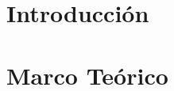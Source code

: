 \documentclass{report}
\begin{document}
  

  \chapter{Introducción}
  

  \chapter{Marco Teórico}
  

  
\end{document}
